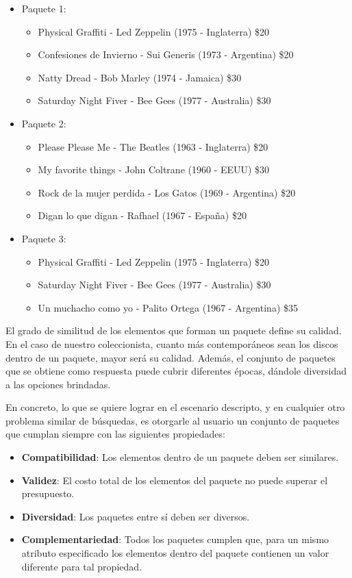 \begin{itemize}
  \item Paquete 1:
  \begin{itemize}
    \item Physical Graffiti - Led Zeppelin (1975 - Inglaterra) \$20
    \item Confesiones de Invierno - Sui Generis (1973 - Argentina) \$20
    \item Natty Dread - Bob Marley (1974 - Jamaica) \$30
		\item Saturday Night Fiver - Bee Gees (1977 - Australia) \$30
  \end{itemize}
  \item Paquete 2:
  \begin{itemize}
	  \item Please Please Me - The Beatles (1963 - Inglaterra) \$20
	  \item My favorite things - John Coltrane (1960 - EEUU) \$30
	  \item Rock de la mujer perdida - Los Gatos (1969 - Argentina) \$20
		\item Digan lo que digan - Rafhael (1967 - España) \$20
  \end{itemize}
	  \item Paquete 3:
  \begin{itemize}
	  \item Physical Graffiti - Led Zeppelin (1975 - Inglaterra) \$20
		\item Saturday Night Fiver - Bee Gees (1977 - Australia) \$30
	  \item Un muchacho como yo - Palito Ortega (1967 - Argentina) \$35
  \end{itemize}
\end{itemize}


El grado de similitud de los elementos que forman un paquete define su calidad. En el caso de nuestro coleccionista, cuanto 
más contemporáneos sean los discos dentro de un paquete, mayor será su calidad. Además, el conjunto de paquetes que se obtiene como respuesta puede cubrir diferentes épocas, dándole diversidad a las opciones brindadas. 

En concreto, lo que se quiere lograr en el escenario descripto, y en cualquier otro problema similar de búsquedas, es otorgarle al usuario un conjunto de paquetes que cumplan siempre con las siguientes propiedades: 

\begin{itemize}
  \item \textbf{Compatibilidad}: Los elementos dentro de un paquete deben ser similares.
  \item \textbf{Validez}: El costo total de los elementos del paquete no puede superar el presupuesto.
  \item \textbf{Diversidad}: Los paquetes entre sí deben ser diversos.
  \item \textbf{Complementariedad}: Todos los paquetes cumplen que, para un mismo atributo especificado los elementos dentro del paquete contienen un valor diferente para tal propiedad.
\end{itemize}

